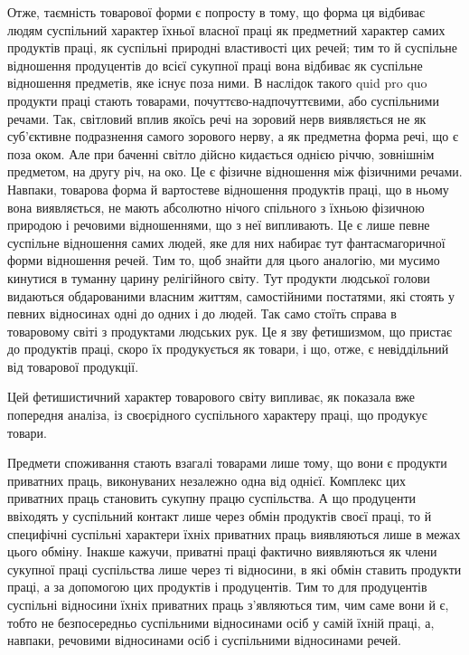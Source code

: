 Отже, таємність товарової форми є попросту в тому, що форма
ця відбиває людям суспільний характер їхньої власної праці як
предметний характер самих продуктів праці, як суспільні природні
властивості цих речей; тим то й суспільне відношення продуцентів
до всієї сукупної праці вона відбиває як суспільне відношення
предметів, яке існує поза ними. В наслідок такого quid
pro quo продукти праці стають товарами, почуттєво-надпочуттєвими,
або суспільними речами. Так, світловий вплив якоїсь речі
на зоровий нерв виявляється не як суб’єктивне подразнення самого
зорового нерву, а як предметна форма речі, що є поза оком.
Але при баченні світло дійсно кидається однією річчю, зовнішнім
предметом, на другу річ, на око. Це є фізичне відношення між
фізичними речами. Навпаки, товарова форма й вартостеве відношення
продуктів праці, що в ньому вона виявляється, не мають
абсолютно нічого спільного з їхньою фізичною природою і речовими
відношеннями, що з неї випливають. Це є лише певне суспільне
відношення самих людей, яке для них набирає тут фантасмагоричної
форми відношення речей. Тим то, щоб знайти для
цього аналогію, ми мусимо кинутися в туманну царину релігійного
світу. Тут продукти людської голови видаються обдарованими
власним життям, самостійними постатями, які стоять у певних
відносинах одні до одних і до людей. Так само стоїть справа
в товаровому світі з продуктами людських рук. Це я зву фетишизмом,
що пристає до продуктів праці, скоро їх продукується
як товари, і що, отже, є невіддільний від товарової продукції.

Цей фетишистичний характер товарового світу випливає, як
показала вже попередня аналіза, із своєрідного суспільного
характеру праці, що продукує товари.

Предмети споживання стають взагалі товарами лише тому, що
вони є продукти приватних праць, виконуваних незалежно одна
від однієї. Комплекс цих приватних праць становить сукупну
працю суспільства. А що продуценти ввіходять у суспільний контакт
лише через обмін продуктів своєї праці, то й специфічні суспільні
характери їхніх приватних праць виявляються лише в
межах цього обміну. Інакше кажучи, приватні праці фактично
виявляються як члени сукупної праці суспільства лише через ті
відносини, в які обмін ставить продукти праці, а за допомогою цих
продуктів і продуцентів. Тим то для продуцентів суспільні відносини
їхніх приватних праць з’являються тим, чим саме вони
й є, тобто не безпосередньо суспільними відносинами осіб у самій
їхній праці, а, навпаки, речовими відносинами осіб і суспільними
відносинами речей.

